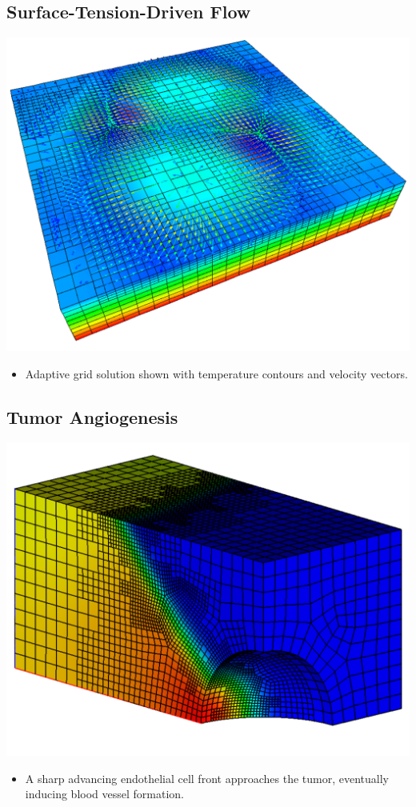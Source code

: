 \subsection*{Surface-Tension-Driven Flow}
\begin{frame}%
  \begin{center}
    \includegraphics[width=.6\textwidth]{figures/rbm_adapt_soln}    
  \end{center}
  \vspace{-.25in}

    \begin{itemize}
    \item{Adaptive grid solution shown
      with temperature contours and velocity vectors.      }
      \end{itemize}
\end{frame}


\subsection*{Tumor Angiogenesis}
\begin{frame}[t]
  \begin{center}
    \includegraphics[width=.6\textwidth]{figures/tumor_model}    
  \end{center}
\vspace{-.35in}
    \begin{itemize}
    \item{A sharp advancing endothelial cell front approaches the
      tumor, eventually inducing blood vessel formation.      }
      \end{itemize}
\end{frame}

